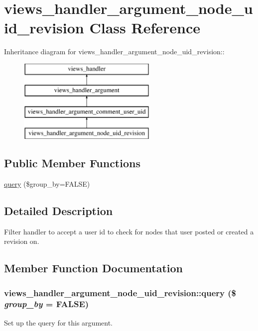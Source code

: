 \hypertarget{classviews__handler__argument__node__uid__revision}{
\section{views\_\-handler\_\-argument\_\-node\_\-uid\_\-revision Class Reference}
\label{classviews__handler__argument__node__uid__revision}
}
Inheritance diagram for views\_\-handler\_\-argument\_\-node\_\-uid\_\-revision::\begin{figure}[H]
\begin{center}
\leavevmode
\includegraphics[height=4cm]{classviews__handler__argument__node__uid__revision}
\end{center}
\end{figure}
\subsection*{Public Member Functions}
\begin{DoxyCompactItemize}
\item 
\hyperlink{classviews__handler__argument__node__uid__revision_a25585cd59a236e99a364fe0a1d6f9b90}{query} (\$group\_\-by=FALSE)
\end{DoxyCompactItemize}


\subsection{Detailed Description}
Filter handler to accept a user id to check for nodes that user posted or created a revision on. 

\subsection{Member Function Documentation}
\hypertarget{classviews__handler__argument__node__uid__revision_a25585cd59a236e99a364fe0a1d6f9b90}{
\subsubsection[{query}]{\setlength{\rightskip}{0pt plus 5cm}views\_\-handler\_\-argument\_\-node\_\-uid\_\-revision::query (\$ {\em group\_\-by} = {\ttfamily FALSE})}}
\label{classviews__handler__argument__node__uid__revision_a25585cd59a236e99a364fe0a1d6f9b90}
Set up the query for this argument.

